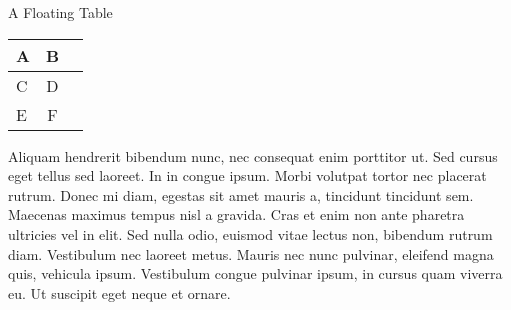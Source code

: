 \begin{floatingtable}{A Floating Table}
	\begin{center}
        \begin{tabular}{|l|c|r|}
    		\hline
    		A & B \\
    		\hline
    		C & D \\
    		E & F \\
    		\hline
    	\end{tabular}
    \end{center}
\end{floatingtable}

Aliquam hendrerit bibendum nunc, nec consequat enim porttitor ut. Sed cursus eget tellus sed laoreet. In in congue ipsum. Morbi volutpat tortor nec placerat rutrum. Donec mi diam, egestas sit amet mauris a, tincidunt tincidunt sem. Maecenas maximus tempus nisl a gravida. Cras et enim non ante pharetra ultricies vel in elit. Sed nulla odio, euismod vitae lectus non, bibendum rutrum diam. Vestibulum nec laoreet metus. Mauris nec nunc pulvinar, eleifend magna quis, vehicula ipsum. Vestibulum congue pulvinar ipsum, in cursus quam viverra eu. Ut suscipit eget neque et ornare.

